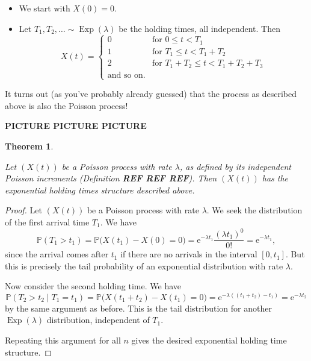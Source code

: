 \documentclass[
  a4paper,
]{article}
\providecommand{\tightlist}{%
  \setlength{\itemsep}{0pt}\setlength{\parskip}{0pt}}
\newtheorem{theorem}{Theorem}[section]
\theoremstyle{definition}
\theoremstyle{definition}
\theoremstyle{definition}
\theoremstyle{remark}
\begin{document}
\begin{itemize}
\tightlist
\item
  We start with \(X(0) = 0\).
\item
  Let \(T_1, T_2, \dots \sim \operatorname{Exp}(\lambda)\) be the holding times, all independent. Then
  \[ X(t) = \begin{cases} 0 & \text{for $0 \leq t < T_1$} \\
    1 & \text{for $T_1 \leq t < T_1 + T_2$} \\
    2 & \text{for $T_1+T_2 \leq t < T_1 + T_2 + T_3$} \\
    \text{and so on.} & \end{cases} \]
\end{itemize}

It turns out (as you've probably already guessed) that the process as described above is also the Poisson process!

\textbf{PICTURE PICTURE PICTURE}

\begin{theorem}
\protect\hypertarget{thm:pois-exp-equiv}{}\label{thm:pois-exp-equiv}

Let \((X(t))\) be a Poisson process with rate \(\lambda\), as defined by its independent Poisson increments (Definition \textbf{REF REF REF}). Then \((X(t))\) has the exponential holding times structure described above.

\end{theorem}

\begin{proof}

Let \((X(t))\) be a Poisson process with rate \(\lambda\). We seek the distribution of the first arrival time \(T_1\). We have
\[ \mathbb P(T_1 > t_1) = \mathbb P\big(X(t_1) - X(0) = 0\big) = \mathrm{e}^{-\lambda t_1} \frac{(\lambda t_1)^0}{0!} = \mathrm{e}^{-\lambda t_1} , \]
since the arrival comes after \(t_1\) if there are no arrivals in the interval \([0,t_1]\).
But this is precisely the tail probability of an exponential distribution with rate \(\lambda\).

Now consider the second holding time. We have
\[ \mathbb P(T_2 > t_2 \mid T_1 = t_1) = \mathbb P\big(X(t_1 + t_2) - X(t_1) = 0\big) = \mathrm{e}^{-\lambda ((t_1 + t_2) - t_1)}  =  \mathrm{e}^{-\lambda t_2} \]
by the same argument as before. This is the tail distribution for another \(\operatorname{Exp}(\lambda)\) distribution, independent of \(T_1\).

Repeating this argument for all \(n\) gives the desired exponential holding time structure.

\end{proof}
\end{document}
